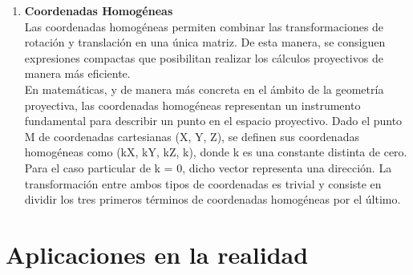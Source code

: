 \documentclass[a4,10pt]{article}
\begin{document}
\begin{enumerate}
\item \textbf{Coordenadas Homogéneas}\\
Las coordenadas homogéneas permiten combinar las transformaciones de rotación y translación en una única matriz. De esta manera, se consiguen expresiones compactas que posibilitan realizar los cálculos proyectivos de manera más eficiente.\\ 
En matemáticas, y de manera más concreta en el ámbito de la geometría proyectiva, las coordenadas homogéneas representan un instrumento fundamental para describir un punto en el espacio proyectivo. Dado el punto M de coordenadas cartesianas (X, Y, Z), se definen sus coordenadas homogéneas como (kX, kY, kZ, k), donde k es una constante distinta de cero. Para el caso particular de k = 0, dicho vector representa una dirección. La transformación entre ambos tipos de coordenadas es trivial y consiste en dividir los tres primeros términos de coordenadas homogéneas por el último.


\end{enumerate}

\section{Aplicaciones en la realidad}
\end{document}
